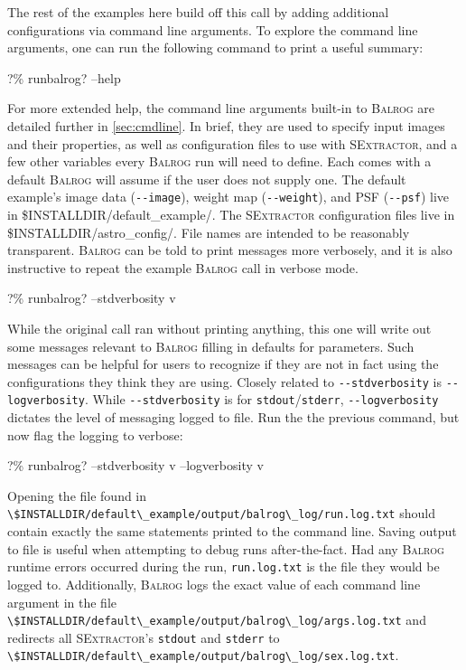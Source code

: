 \documentclass[11pt]{book}
\newcommand{\codett}[1]{\lstinline{#1}}
\newcommand{\balrog}{\textsc{Balrog}}
\newcommand{\sex}{\textsc{SExtractor}}
\newcommand{\opt}[1]{\codett{--#1}}
\newcommand{\bcmd}{\% runbalrog}
\begin{document}
\noindent The rest of the examples here build off this call by adding additional configurations via command line arguments.
To explore the command line arguments, one can run the following command to print a useful summary:

\begin{cmdline}
?\bcmd{}? --help
\end{cmdline}

\noindent For more extended help, the command line arguments built-in to \balrog{} are detailed further in \autoref{sec:cmdline}.
In brief, they are used to specify input images and their properties, as well as configuration
files to use with \sex{}, and a few other variables every \balrog{} run will need to define. 
Each comes with a default \balrog{} will assume if the user does not supply one.
The default example's image data (\opt{image}), 
weight map (\opt{weight}), 
and PSF (\opt{psf})
live in {\ttfamily \$INSTALLDIR/default\_example/}.
The \sex{} configuration files live in 
{\ttfamily \$INSTALLDIR/astro\_config/}. 
File names are intended to be reasonably transparent.
\balrog{} can be told to print messages more verbosely, 
and it is also instructive to repeat the example \balrog{} call in verbose mode.

\begin{cmdline}
?\bcmd{}? --stdverbosity v
\end{cmdline}

\noindent While the original call ran without printing anything, this one will write out some messages
relevant to \balrog{} filling in defaults for parameters.
Such messages can be helpful for users to recognize 
if they are not in fact using the configurations they think they are using.
Closely related to \opt{stdverbosity} is \opt{logverbosity}.
While \opt{stdverbosity} is for \codett{stdout}/\codett{stderr},
\opt{logverbosity} dictates the level of messaging logged to file.
Run the the previous command, but now flag the logging to verbose:

\begin{cmdline}
?\bcmd? --stdverbosity v --logverbosity v
\end{cmdline}

\noindent Opening the file found in \codett{\$INSTALLDIR/default\_example/output/balrog\_log/run.log.txt}
should contain exactly the same statements printed to the command line.
Saving output to file is useful when attempting to debug runs after-the-fact.
Had any \balrog{} runtime errors occurred during the run,
\codett{run.log.txt} is the file they would be logged to.
Additionally, \balrog{} logs the exact value of each command line argument in the file
\codett{\$INSTALLDIR/default\_example/output/balrog\_log/args.log.txt}
and redirects all \sex{}'s \codett{stdout} and \codett{stderr} to \codett{\$INSTALLDIR/default\_example/output/balrog\_log/sex.log.txt}.
\end{document}
